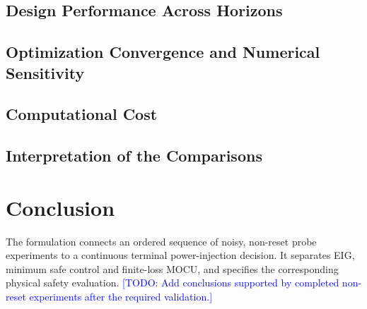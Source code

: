 \documentclass[journal]{IEEEtran}
\newcommand{\todo}[1]{\textcolor{blue}{[TODO: #1]}}
\begin{document}
\subsection{Design Performance Across Horizons}
\subsection{Optimization Convergence and Numerical Sensitivity}
\subsection{Computational Cost}
\subsection{Interpretation of the Comparisons}

\section{Conclusion}
\label{sec:conclusion}
The formulation connects an ordered sequence of noisy, non-reset probe
experiments to a continuous terminal power-injection decision. It separates
EIG, minimum safe control and finite-loss MOCU, and specifies the corresponding
physical safety evaluation. \todo{Add conclusions supported by completed
non-reset experiments after the required validation.}



\end{document}
